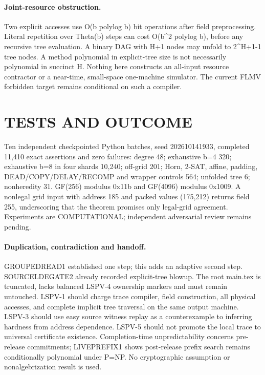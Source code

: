 \documentclass{article}
\begin{document}
\paragraph{Joint-resource obstruction.} Two explicit accesses use O(b polylog b) bit operations after field preprocessing. Literal repetition over Theta(b) steps can cost O(b^2 polylog b), before any recursive tree evaluation. A binary DAG with H+1 nodes may unfold to 2^{H+1}-1 tree nodes. A method polynomial in explicit-tree size is not necessarily polynomial in succinct H. Nothing here constructs an all-input resource contractor or a near-time, small-space one-machine simulator. The current FLMV forbidden target remains conditional on such a compiler.

\section{TESTS AND OUTCOME}
Ten independent checkpointed Python batches, seed 202610141933, completed 11,410 exact assertions and zero failures: degree 48; exhaustive b=4 320; exhaustive b=8 in four shards 10,240; off-grid 201; Horn, 2-SAT, affine, padding, DEAD/COPY/DELAY/RECOMP and wrapper controls 564; unfolded tree 6; nonheredity 31. GF(256) modulus 0x11b and GF(4096) modulus 0x1009. A nonlegal grid input with address 185 and packed values (175,212) returns field 255, underscoring that the theorem promises only legal-grid agreement. Experiments are COMPUTATIONAL; independent adversarial review remains pending.

\paragraph{Duplication, contradiction and handoff.} GROUPEDREAD1 established one step; this adds an adaptive second step. SOURCELDEGATE2 already recorded explicit-tree blowup. The root main.tex is truncated, lacks balanced LSPV-4 ownership markers and must remain untouched. LSPV-1 should charge trace compiler, field construction, all physical accesses, and complete implicit tree traversal on the same output machine. LSPV-3 should use easy source witness replay as a counterexample to inferring hardness from address dependence. LSPV-5 should not promote the local trace to universal certificate existence. Completion-time unpredictability concerns pre-release commitments; LIVEPREFIX1 shows post-release prefix search remains conditionally polynomial under P=NP. No cryptographic assumption or nonalgebrization result is used.
\end{document}
